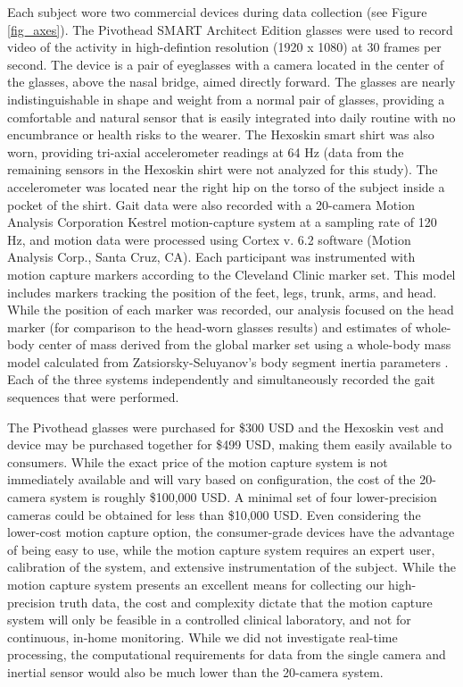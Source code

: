 \documentclass[12pt]{report}
\begin{document}
Each subject wore two commercial devices during data collection (see Figure \ref{fig_axes}). The Pivothead SMART Architect Edition glasses \cite{Pivothead2017Pivothead} were used to record video of the activity in high-defintion resolution (1920 x 1080) at 30 frames per second. The device is a pair of eyeglasses with a camera located in the center of the glasses, above the nasal bridge, aimed directly forward. The glasses are nearly indistinguishable in shape and weight from a normal pair of glasses, providing a comfortable and natural sensor that is easily integrated into daily routine with no encumbrance or health risks to the wearer. The Hexoskin smart shirt \cite{CarreTechnologies2017HexoskinShirts, Banerjee2017ValidatingManagement} was also worn, providing tri-axial accelerometer readings at 64 Hz (data from the remaining sensors in the Hexoskin shirt were not analyzed for this study). The accelerometer was located near the right hip on the torso of the subject inside a pocket of the shirt. Gait data were also recorded with a 20-camera Motion Analysis Corporation Kestrel motion-capture system at a sampling rate of 120 Hz, and motion data were processed using Cortex v. 6.2 software (Motion Analysis Corp., Santa Cruz, CA). Each participant was instrumented with motion capture markers according to the Cleveland Clinic marker set. This model includes markers tracking the position of the feet, legs, trunk, arms, and head. While the position of each marker was recorded, our analysis focused on the head marker (for comparison to the head-worn glasses results) and estimates of whole-body center of mass derived from the global marker set using a whole-body mass model calculated from Zatsiorsky-Seluyanov's body segment inertia parameters \cite{deLeva1996AdjustmentsParameters}. Each of the three systems independently and simultaneously recorded the gait sequences that were performed.

The Pivothead glasses were purchased for \$300 USD and the Hexoskin vest and device may be purchased together for \$499 USD, making them easily available to consumers. While the exact price of the motion capture system is not immediately available and will vary based on configuration, the cost of the 20-camera system is roughly \$100,000 USD. A minimal set of four lower-precision cameras could be obtained for less than \$10,000 USD. Even considering the lower-cost motion capture option, the consumer-grade devices have the advantage of being easy to use, while the motion capture system requires an expert user, calibration of the system, and extensive instrumentation of the subject. While the motion capture system presents an excellent means for collecting our high-precision truth data, the cost and complexity dictate that the motion capture system will only be feasible in a controlled clinical laboratory, and not for continuous, in-home monitoring. While we did not investigate real-time processing, the computational requirements for data from the single camera and inertial sensor would also be much lower than the 20-camera system.
\end{document}
